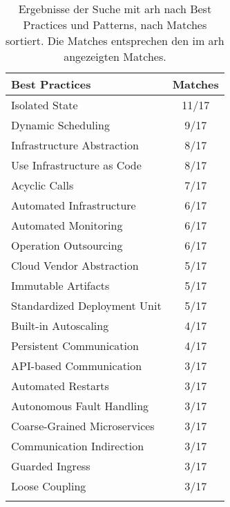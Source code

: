 \begin{table}[!htb]
\begin{minipage}{.5\linewidth}
		\begin{tabular}{p{5cm} c}
			\toprule
			\textbf{Best Practices} & \textbf{Matches} \\ \midrule
			Isolated State                        & 11/17 \\ \hline
			Dynamic Scheduling                    & 9/17 \\ \hline
			Infrastructure Abstraction            & 8/17 \\ \hline
			Use Infrastructure as Code            & 8/17 \\ \hline
			Acyclic Calls                         & 7/17 \\ \hline
			Automated Infrastructure              & 6/17 \\ \hline
			Automated Monitoring                  & 6/17 \\ \hline
			Operation Outsourcing                 & 6/17 \\ \hline
			Cloud Vendor Abstraction              & 5/17 \\ \hline
			Immutable Artifacts                   & 5/17 \\ \hline
			Standardized Deployment Unit          & 5/17 \\ \hline
			Built-in Autoscaling                  & 4/17 \\ \hline
			Persistent Communication              & 4/17 \\ \hline
			API-based Communication               & 3/17 \\ \hline
			Automated Restarts                    & 3/17 \\ \hline
			Autonomous Fault Handling             & 3/17 \\ \hline
			Coarse-Grained Microservices          & 3/17 \\ \hline
			Communication Indirection             & 3/17 \\ \hline
			Guarded Ingress                       & 3/17 \\ \hline
			Loose Coupling                        & 3/17 \\ \bottomrule
			\\
		\end{tabular}
	\end{minipage}

	\caption[Best Practices und Patterns Suchergebnisse]{
		Ergebnisse der Suche mit \acrshort{arh} nach Best Practices und Patterns, nach Matches sortiert.
		Die Matches entsprechen den im \gls{arh} angezeigten Matches.
	}
	\label{tab:interviews-patterns}
\end{table}

